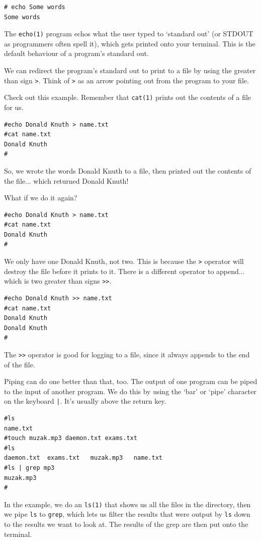 \begin{verbatim}
# echo Some words
Some words
\end{verbatim}

The {\tt echo(1)} program echos what the user typed to `standard out' (or STDOUT as 
programmers often spell it), which 
gets printed onto your terminal. This is the default behaviour of a program's standard
out.
	
We can redirect the program's standard out to print to a file by using the greater
than sign {\tt >}. Think of {\tt >} as an arrow pointing out from the program to your file.

Check out this example. Remember that {\tt cat(1)} prints out the contents of a file for us.

\begin{verbatim}
#echo Donald Knuth > name.txt
#cat name.txt 
Donald Knuth
#
\end{verbatim}

So, we wrote the words Donald Knuth to a file, then printed out the contents of the
file... which returned Donald Knuth!

What if we do it again?
\begin{verbatim}
#echo Donald Knuth > name.txt
#cat name.txt 
Donald Knuth
#
\end{verbatim}

We only have one Donald Knuth, not two. This is because the {\tt >}	operator
will destroy the file before it prints to it. There is a different operator
to append... which is two greater than signs {\tt >>}.

\begin{verbatim}
#echo Donald Knuth >> name.txt
#cat name.txt
Donald Knuth
Donald Knuth
#
\end{verbatim}

The {\tt >>} operator is good for logging to a file, since it always appends
to the end of the file.

Piping can do one better than that, too. The output of one program can 
be piped to the input of another program. We do this by using the `bar' or 
`pipe' character on the keyboard {\tt |}. It's usually above the return key.

\begin{verbatim}
#ls
name.txt
#touch muzak.mp3 daemon.txt exams.txt
#ls
daemon.txt	exams.txt	muzak.mp3	name.txt
#ls | grep mp3
muzak.mp3
#
\end{verbatim}

In the example, we do an {\tt ls(1)} that shows us all the files in the directory,
then we pipe {\tt ls} to {\tt grep}, which lets us filter the results that were 
output by {\tt ls} down to the results we want to look at. The results of the 
grep are then put onto the terminal. 

